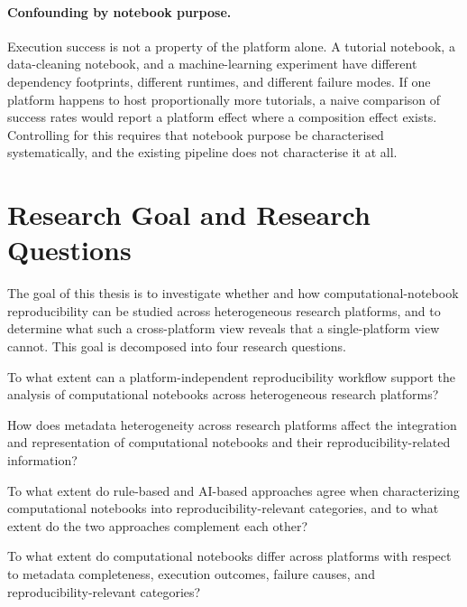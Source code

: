 \paragraph{Confounding by notebook purpose.} Execution success is not a property of the platform alone. A tutorial notebook, a data-cleaning notebook, and a machine-learning experiment have different dependency footprints, different runtimes, and different failure modes. If one platform happens to host proportionally more tutorials, a naive comparison of success rates would report a platform effect where a composition effect exists. Controlling for this requires that notebook purpose be characterised systematically, and the existing pipeline does not characterise it at all.

\section{Research Goal and Research Questions}
\label{sec:research-questions}

The goal of this thesis is to investigate whether and how computational-notebook reproducibility can be studied across heterogeneous research platforms, and to determine what such a cross-platform view reveals that a single-platform view cannot. This goal is decomposed into four research questions.

\begin{description}[leftmargin=1.3cm,labelwidth=1.05cm,style=nextline]
  \item[\textbf{RQ1}] To what extent can a platform-independent reproducibility workflow support the analysis of computational notebooks across heterogeneous research platforms?
  \item[\textbf{RQ2}] How does metadata heterogeneity across research platforms affect the integration and representation of computational notebooks and their reproducibility-related information?
  \item[\textbf{RQ3}] To what extent do rule-based and AI-based approaches agree when characterizing computational notebooks into reproducibility-relevant categories, and to what extent do the two approaches complement each other?
  \item[\textbf{RQ4}] To what extent do computational notebooks differ across platforms with respect to metadata completeness, execution outcomes, failure causes, and reproducibility-relevant categories?
\end{description}


